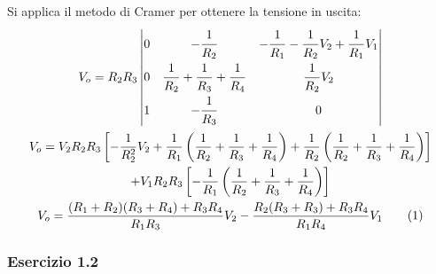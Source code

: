 \documentclass{article}
\newcommand{\tageq}{\tag{\stepcounter{equation}\theequation}}
\begin{document}
Si applica il metodo di Cramer per ottenere la tensione in uscita:
\begin{gather*}
    V_o=R_2R_3\begin{vmatrix}
        0 &-\displaystyle\frac{\strut1}{\strut R_2}&-\displaystyle\frac{\strut 1}{\strut R_1}-\frac{\strut 1}{\strut R_2}V_2+\frac{\strut 1}{\strut R_1}V_1\\
        0&\displaystyle\frac{\strut 1}{\strut R_2}+\frac{\strut 1}{\strut R_3}+\frac{\strut 1}{\strut R_4}&\displaystyle\frac{\strut 1}{\strut R_2}V_2\\
        1&-\displaystyle\frac{\strut1}{\strut R_3}&0
    \end{vmatrix}\\
    V_o=\displaystyle V_2R_2R_3\left[-\frac{1}{R_2^2}V_2+\frac{1}{R_1}\left(\frac{1}{R_2}+\frac{1}{R_3}+\frac{1}{R_4}\right)+\frac{1}{R_2}\left(\frac{1}{R_2}+\frac{1}{R_3}+\frac{1}{R_4}\right)\right]\\
    +V_1R_2R_3\left[-\frac{1}{R_1}\left(\frac{1}{R_2}+\frac{1}{R_3}+\frac{1}{R_4}\right)\right]\\
    V_o=\displaystyle\frac{(R_1+R_2)(R_3+R_4)+R_3R_4}{R_1R_3}V_2-\frac{R_2(R_3+R_3)+R_3R_4}{R_1R_4}V_1\tageq
\end{gather*}

\subsubsection*{Esercizio 1.2}
\end{document}
